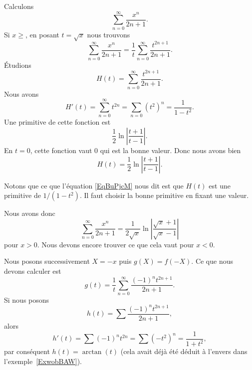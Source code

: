 \begin{example}
Calculons
\begin{equation}
    \sum_{n=0}^{\infty}\frac{ x^n }{ 2n+1 }.
\end{equation}
Si \( x\geq\), en posant \( t=\sqrt{x}\) nous trouvons
\begin{equation}
    \sum_{n=0}^{\infty}\frac{ x^n }{ 2n+1 }=\frac{1}{ t }\sum_{n=0}^{\infty}\frac{ t^{2n+1} }{ 2n+1 }.
\end{equation}
Étudions
\begin{equation}
    H(t)=\sum_{n=0}^{\infty}\frac{ t^{2n+1} }{ 2n+1 }.
\end{equation}
Nous avons
\begin{equation}     \label{EqBuPjcM}
    H'(t)=\sum_{n=0}^{\infty}t^{2n}=\sum_{n=0}(t^2)^n=\frac{1}{ 1-t^2 }.
\end{equation}
Une primitive de cette fonction est
\begin{equation}
    \frac{ 1 }{2}\ln\left| \frac{ t+1 }{ t-1 } \right|.
\end{equation}
En \( t=0\), cette fonction vaut \( 0\) qui est la bonne valeur. Donc nous avons bien
\begin{equation}
    H(t)=\frac{ 1 }{2}\ln\left| \frac{ t+1 }{ t-1 } \right|.
\end{equation}

Notons que ce que l'équation \eqref{EqBuPjcM} nous dit est que \( H(t)\) est une primitive de \( 1/(1-t^2)\). Il faut choisir la bonne primitive en fixant une valeur.

Nous avons donc
\begin{equation}
    \sum_{n=0}^{\infty}\frac{ x^n }{ 2n+1 }=\frac{ 1 }{2\sqrt{x}}\ln\left| \frac{ \sqrt{x}+1 }{ \sqrt{x}-1 } \right|
\end{equation}
pour \( x>0\). Nous devons encore trouver ce que cela vaut pour \( x<0\).

    Nous posons successivement \( X=-x\) puis \( g(X)=f(-X)\). Ce que nous devons calculer est
    \begin{equation}
        g(t)=\frac{1}{ t }\sum_{n=0}^{\infty}\frac{ (-1)^nt^{2n+1} }{ 2n+1 }.
    \end{equation}
    Si nous posons
    \begin{equation}
        h(t)=\sum \frac{ (-1)^nt^{2n+1} }{ 2n+1 },
    \end{equation}
    alors
    \begin{equation}
        h'(t)=\sum (-1)^nt^{2n}=\sum (-t^2)^n=\frac{1}{ 1+t^2 },
    \end{equation}
    par conséquent \( h(t)=\arctan(t)\) (cela avait déjà été déduit à l'envers dans l'exemple~\ref{ExwobBAW}).


\end{example}
